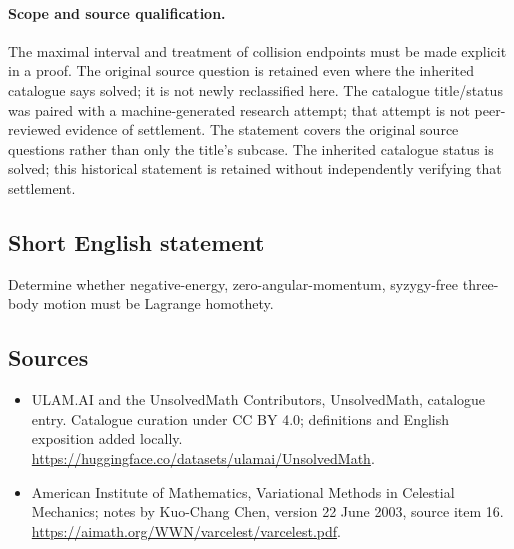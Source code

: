 \documentclass[11pt]{article}
\begin{document}
\paragraph{Scope and source qualification.}The maximal interval and treatment of collision endpoints must be made explicit in a proof. The original source question is retained even where the inherited catalogue says solved; it is not newly reclassified here. The catalogue title/status was paired with a machine-generated research attempt; that attempt is not peer-reviewed evidence of settlement. The statement covers the original source questions rather than only the title’s subcase. The inherited catalogue status is solved; this historical statement is retained without independently verifying that settlement.
\subsection{Short English statement}
Determine whether negative-energy, zero-angular-momentum, syzygy-free three-body motion must be Lagrange homothety.
\subsection{Sources}
\begin{itemize}
\item[\hypertarget{source:statement:1}{S1}] ULAM.AI and the UnsolvedMath Contributors, UnsolvedMath, catalogue entry. Catalogue curation under CC BY 4.0; definitions and English exposition added locally.
\url{https://huggingface.co/datasets/ulamai/UnsolvedMath}.
\item[\hypertarget{source:statement:2}{S2}] American Institute of Mathematics, Variational Methods in Celestial Mechanics; notes by Kuo-Chang Chen, version 22 June 2003, source item 16.
\url{https://aimath.org/WWN/varcelest/varcelest.pdf}.
\end{itemize}
\label{end:statement}
\end{document}
